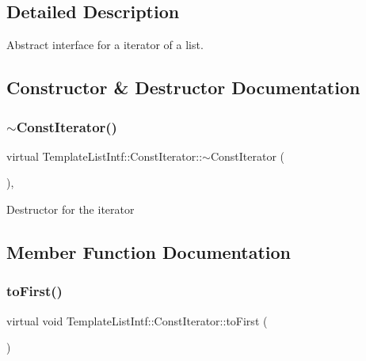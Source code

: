 \subsection{Detailed Description}
Abstract interface for a iterator of a list. 

\subsection{Constructor \& Destructor Documentation}
\mbox{\label{class_template_list_intf_1_1_const_iterator_a831a69d0d66057405396a89fe2371567}} 
\subsubsection{\texorpdfstring{$\sim$ConstIterator()}{~ConstIterator()}}
{\footnotesize\ttfamily virtual Template\+List\+Intf\+::\+Const\+Iterator\+::$\sim$\+Const\+Iterator (\begin{DoxyParamCaption}{ }\end{DoxyParamCaption})\hspace{0.3cm}{\ttfamily [inline]}, {\ttfamily [virtual]}}

Destructor for the iterator 

\subsection{Member Function Documentation}
\mbox{\label{class_template_list_intf_1_1_const_iterator_ab0d366c70210b05cf32f465d953d3152}} 
\subsubsection{\texorpdfstring{toFirst()}{toFirst()}}
{\footnotesize\ttfamily virtual void Template\+List\+Intf\+::\+Const\+Iterator\+::to\+First (\begin{DoxyParamCaption}{ }\end{DoxyParamCaption})\hspace{0.3cm}{\ttfamily [pure virtual]}}

